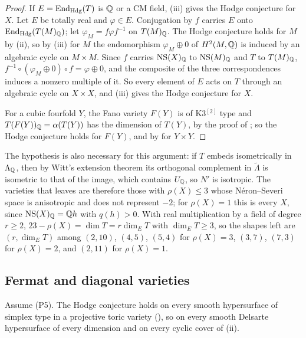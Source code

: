 \begin{proof}
If $E=\operatorname{End}_{\mathrm{Hdg}}(T)$ is $\mathbb{Q}$ or a CM field,
(iii) gives the Hodge conjecture for $X$. Let $E$ be
totally real and $\varphi\in E$. Conjugation by $f$ carries $E$ onto
$\operatorname{End}_{\mathrm{Hdg}}(T(M)_{\mathbb{Q}})$; let $\varphi_{M}=f\varphi f^{-1}$ on
$T(M)_{\mathbb{Q}}$. The Hodge conjecture holds for $M$ by (ii), so
by (iii) for $M$ the endomorphism $\varphi_{M}\oplus0$ of
$H^{2}(M,\mathbb{Q})$ is induced by an algebraic cycle on $M\times M$. Since $f$
carries $\mathrm{NS}(X)_{\mathbb{Q}}$ to $\mathrm{NS}(M)_{\mathbb{Q}}$ and $T$ to $T(M)_{\mathbb{Q}}$,
$f^{-1}\circ(\varphi_{M}\oplus0)\circ f=\varphi\oplus0$, and the composite
of the three correspondences \cite[\S16.1]{Ful98} induces a nonzero multiple
of it. So every element of $E$ acts on $T$ through an algebraic cycle on
$X\times X$, and (iii) gives the Hodge conjecture for
$X$.

For a cubic fourfold $Y$, the Fano variety $F(Y)$ is of K3$^{[2]}$ type and
$T(F(Y))_{\mathbb{Q}}=\alpha(T(Y))$ has the dimension of $T(Y)$, by the proof of
; so the Hodge conjecture holds for $F(Y)$, and by
 for $Y\times Y$.
\end{proof}

The hypothesis is also necessary for this argument: if $T$ embeds
isometrically in $\Lambda_{\mathbb{Q}}$, then by Witt's extension theorem its
orthogonal complement in $\tilde\Lambda$ is isometric to that of the image,
which contains $U_{\mathbb{Q}}$, so $N'$ is isotropic. The varieties that
 leaves are therefore those with $\rho(X)\le3$ whose
N\'eron--Severi space is anisotropic and does not represent $-2$; for
$\rho(X)=1$ this is every $X$, since $\mathrm{NS}(X)_{\mathbb{Q}}=\mathbb{Q} h$ with $q(h)>0$.
With real multiplication by a field of degree $r\ge2$,
$23-\rho(X)=\dim T=r\dim_{E}T$ with $\dim_{E}T\ge3$, so the shapes left
are $(r,\dim_{E}T)$ among $(2,10)$, $(4,5)$, $(5,4)$ for $\rho(X)=3$,
$(3,7)$, $(7,3)$ for $\rho(X)=2$, and $(2,11)$ for $\rho(X)=1$.

\subsection{Fermat and diagonal varieties}\label{ssec:fermatall}

\begin{corollary}\label{cor:simplexhc}
Assume \textup{(P5)}. The Hodge conjecture holds on every smooth hypersurface
of simplex type in a projective toric variety (), so on
every smooth Delsarte hypersurface of every dimension and on every cyclic
cover of (ii).
\end{corollary}

